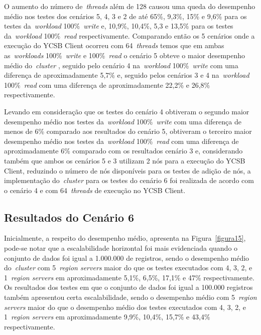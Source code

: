 \documentclass[12pt]{article}
\begin{document}
O aumento do número de~\emph{threads} além de 128 causou uma queda do desempenho médio nos testes dos cenários 5, 4, 3 e 2 de até 65\%, 9,3\%, 15\% e 9,6\% para os testes da~\emph{workload} 100\%~\emph{write} e, 10,9\%, 10,4\%, 5,3 e 13,5\% para os testes da~\emph{workload} 100\%~\emph{read} respectivamente. 
Comparando então os 5 cenários onde a execução do YCSB Client ocorreu com 64~\emph{threads} temos que em ambas as~\emph{workloads} 100\%~\emph{write} e 100\%~\emph{read} o cenário 5 obteve o maior desempenho médio do~\emph{cluster} , seguido pelo cenário 4 na~\emph{workload} 100\%~\emph{write} com uma diferença de aproximadamente 5,7\% e, seguido pelos cenários 3 e 4 na~\emph{workload} 100\%~\emph{read} com uma diferença de aproximadamente 22,2\% e 26,8\% respectivamente.

Levando em consideração que os testes do cenário 4 obtiveram o segundo maior desempenho médio nos testes da~\emph{workload} 100\%~\emph{write} com uma diferença de menos de 6\% comparado aos resultados do cenário 5, obtiveram o terceiro maior desempenho médio nos testes da~\emph{workload} 100\%~\emph{read} com uma diferença de aproximadamente 6\% comparado com os resultados cenário 3 e, considerando também que ambos os cenários 5 e 3 utilizam 2 nós para a execução do YCSB Client, reduzindo o número de nós disponíveis para os testes de adição de nós, a implementação do~\emph{cluster}  para os testes do cenário 6 foi realizada de acordo com o cenário 4 e com 64~\emph{threads} de execução no YCSB Client.


\subsection{Resultados do Cenário 6}

Inicialmente, a respeito do desempenho médio, apresenta na Figura~\ref{figura15}, pode-se notar que a escalabilidade horizontal foi mais evidenciada quando o conjunto de dados foi igual a 1.000.000 de registros, sendo o desempenho médio do~\emph{cluster}  com 5~\emph{region servers} maior do que os testes executados com 4, 3, 2, e 1~\emph{region servers} em aproximadamente 5,1\%, 6,5\%, 17,1\% e 47\% respectivamente. 
Os resultados dos testes em que o conjunto de dados foi igual a 100.000 registros também apresentou certa escalabilidade, sendo o desempenho médio com 5~\emph{region servers} maior do que o desempenho médio dos testes executados com 4, 3, 2, e 1~\emph{region servers} em aproximadamente 9,9\%, 10,4\%, 15,7\% e 43,4\% respectivamente.
\end{document}
